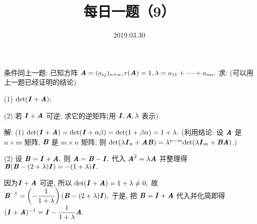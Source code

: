 \documentclass[UTF8]{ctexart}
\title{\textbf{每日一题（9）}}
\date{2019.03.30}
\begin{document}
\maketitle
条件同上一题: 已知方阵 $\textbf{\textit{A}}=(a_{ij})_{n\times n}, r(\textbf{\textit{A}})=1,\lambda=a_{11}+\cdots+a_{nn},$ 求: (可以用上一题已经证明的结论)

(1) ${\rm det}(\textbf{\textit{I}}+\textbf{\textit{A}});$

(2) 若 $\textbf{\textit{I}}+\textbf{\textit{A}}$ 可逆, 求它的逆矩阵(用 $\textbf{\textit{I}},\textbf{\textit{A}},\lambda$ 表示).

解: (1) ${\rm det}(\textbf{\textit{I}}+\textbf{\textit{A}})={\rm det}(\textbf{\textit{I}}+\alpha \beta)={\rm det}(1+\beta \alpha)=1+\lambda.$ (利用结论: 设 $\textbf{\textit{A}}$ 是 $n \times m$ 矩阵, $\textbf{\textit{B}}$ 是 $m \times n$ 矩阵, 则 ${\rm det}(\lambda \textbf{\textit{I}}_n+\textbf{\textit{AB}})=\lambda ^{n-m}{\rm det}(\lambda \textbf{\textit{I}}_m+\textbf{\textit{BA}})$.)

(2) 设 $\textbf{\textit{B}}=\textbf{\textit{I}}+\textbf{\textit{A}},$ 则 $\textbf{\textit{A}}=\textbf{\textit{B}}-\textbf{\textit{I}},$ 代入 $\textbf{\textit{A}}^2 = \lambda \textbf{\textit{A}}$ 并整理得 $\textbf{\textit{B}}(\textbf{\textit{B}}-(2+\lambda)\textbf{\textit{I}})=-(1+\lambda)\textbf{\textit{I}}.$

因为$\textbf{\textit{I}}+\textbf{\textit{A}}$ 可逆, 所以  ${\rm det}(\textbf{\textit{I}}+\textbf{\textit{A}})=1+\lambda \neq 0,$ 故  $\textbf{\textit{B}}^{-1}=\left(-\displaystyle \frac{1}{1+\lambda}\right)(\textbf{\textit{B}}-(2+\lambda)\textbf{\textit{I}}),$ 于是, 把 $\textbf{\textit{B}}=\textbf{\textit{I}}+\textbf{\textit{A}}$ 代入并化简即得 $(\textbf{\textit{I}}+\textbf{\textit{A}})^{-1}=\textbf{\textit{I}}-\displaystyle \frac{1}{1+\lambda}\textbf{\textit{A}}.$
\end{document}
